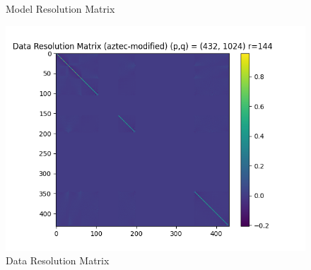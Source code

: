 \documentclass{article}
\begin{document}
\begin{itemize}
\begin{figure}[h]
    \caption{Model Resolution Matrix}
\end{figure}
\begin{figure}[h]
    \centering
    \includegraphics[width=1\textwidth]{images/outputs/datares/aztec-modified.png}
    \caption{Data Resolution Matrix}
\end{figure}
\clearpage



\end{itemize}
\end{document}
